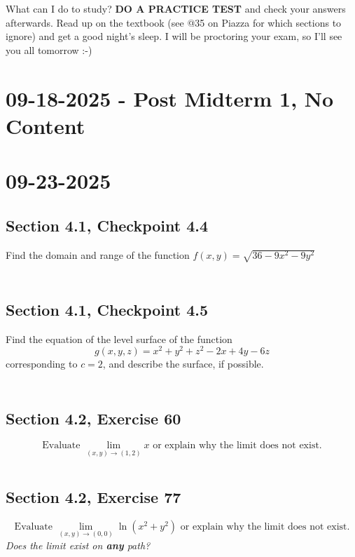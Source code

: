 \documentclass[]{mangos-musings}
\begin{document}
What can I do to study?
\textbf{DO A PRACTICE TEST} and check your answers afterwards. Read up on the textbook (see @35 on Piazza for which sections to ignore) and get a good night's sleep. I will be proctoring your exam, so I'll see you all tomorrow :-)

\newpage
\section{09-18-2025 - Post Midterm 1, No Content}

\newpage
\section{09-23-2025}
\subsection{Section 4.1, Checkpoint 4.4}
Find the domain and range of the function $f(x, y) = \sqrt{36 - 9x^2 - 9y^2}$
\begin{align*}
  \\ \\ \\
\end{align*}
\subsection{Section 4.1, Checkpoint 4.5}
Find the equation of the level surface of the function 
\[g(x, y, z) = x^2 + y^2 + z^2 - 2x + 4y - 6z\]
corresponding to $c = 2$, and describe the surface, if possible.
\begin{align*}
  \\ \\ \\
\end{align*}
\subsection{Section 4.2, Exercise 60}
\[\text{Evaluate }\lim_{(x, y)\to(1, 2)}x \text{ or explain why the limit does not exist.}\] %
\begin{align*}
  \\
\end{align*}
\subsection{Section 4.2, Exercise 77}
\[\text{Evaluate } \lim_{(x, y)\to(0, 0)}\ln (x^2 + y^2) \text{ or explain why the limit does not exist.} \]
\textit{Does the limit exist on \textbf{any} path?}
\end{document}
